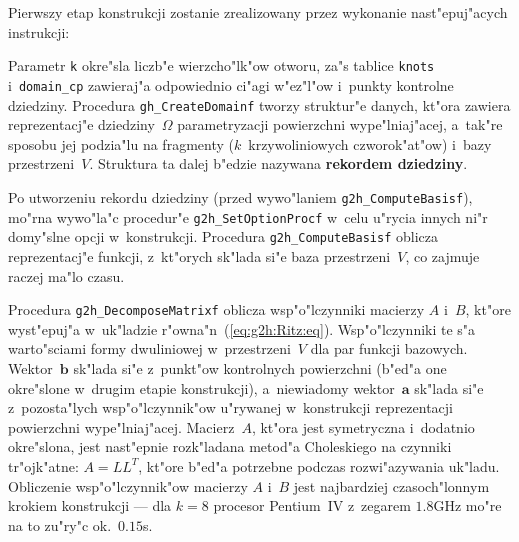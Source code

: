 Pierwszy etap konstrukcji zostanie zrealizowany przez wykonanie
nast"epuj"acych instrukcji:

\vspace{\medskipamount}

\vspace{\medskipamount}
\begin{sloppypar}
Parametr \texttt{k} okre"sla liczb"e wierzcho"lk"ow otworu, za"s
tablice \texttt{knots} i~\texttt{domain\_cp} zawieraj"a odpowiednio ci"agi
w"ez"l"ow i~punkty kontrolne dziedziny. Procedura \texttt{gh\_CreateDomainf}
tworzy struktur"e danych, kt"ora zawiera reprezentacj"e dziedziny~$\varOmega$
parametryzacji powierzchni wype"lniaj"acej, a~tak"re sposobu jej podzia"lu
na fragmenty ($k$~krzywoliniowych czworok"at"ow) i~bazy przestrzeni~$V$.
Struktura ta dalej b"edzie nazywana \textbf{rekordem dziedziny}.%
\end{sloppypar}

\begin{sloppypar}
Po utworzeniu rekordu dziedziny (przed wywo"laniem \texttt{g2h\_ComputeBasisf}),
mo"r\-na wywo"la"c procedur"e \texttt{g2h\_SetOptionProcf} w~celu u"rycia innych
ni"r domy"slne opcji w~konstrukcji. Procedura \texttt{g2h\_ComputeBasisf}
oblicza reprezentacj"e funkcji, z~kt"orych sk"lada si"e baza przestrzeni~$V$,
co zajmuje raczej ma"lo czasu.%
\end{sloppypar}

Procedura \texttt{g2h\_DecomposeMatrixf} oblicza wsp"o"lczynniki macierzy
$A$ i~$B$, kt"ore wyst"epuj"a w~uk"ladzie r"owna"n~(\ref{eq:g2h:Ritz:eq}).
Wsp"o"lczynniki te s"a warto"sciami formy dwuliniowej w~przestrzeni~$V$ dla
par funkcji bazowych. Wektor~$\bm{b}$ sk"lada si"e z~punkt"ow kontrolnych
powierzchni (b"ed"a one okre"slone w~drugim etapie konstrukcji),
a~niewiadomy wektor~$\bm{a}$ sk"lada si"e z~pozosta"lych wsp"o"lczynnik"ow
u"rywanej w~konstrukcji reprezentacji powierzchni wype"lniaj"acej. Macierz~$A$,
kt"ora jest symetryczna i~dodatnio okre"slona, jest nast"epnie rozk"ladana
metod"a Choleskiego na czynniki tr"ojk"atne: $A=LL^T$, kt"ore b"ed"a potrzebne
podczas rozwi"azywania uk"ladu. Obliczenie wsp"o"lczynnik"ow macierzy $A$ i~$B$
jest najbardziej czasoch"lonnym krokiem konstrukcji --- dla $k=8$ procesor
Pentium~IV z~zegarem $1.8$GHz mo"re na to zu"ry"c ok.~$0.15$s.


